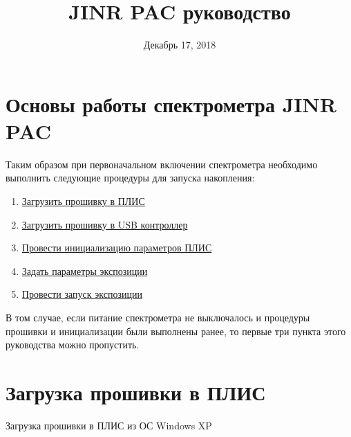 \documentclass[]{article}
\title{JINR PAC руководство}
\author{}
\date{Декабрь 17, 2018}
\begin{document}
\maketitle

\section{Основы работы спектрометра JINR PAC}

Таким образом при первоначальном включении спектрометра необходимо
выполнить следующие процедуры для запуска накопления:

\begin{enumerate}
\def\labelenumi{\arabic{enumi}.}
\item
  \hyperref[firmwareux5fFPGA]{Загрузить прошивку в ПЛИС}
\item
  \hyperref[firmwareux5fUSB]{Загрузить прошивку в USB контроллер}
\item
  \hyperref[initux5fFPGA]{Провести инициализацию параметров ПЛИС}
\item
  \hyperref[setux5fexposition]{Задать параметры экспозиции}
\item
  \hyperref[startux5fexposition]{Провести запуск экспозиции}
\end{enumerate}

В том случае, если питание спектрометра не выключалось и процедуры
прошивки и инициализации были выполнены ранее, то первые три пункта
этого руководства можно пропустить.

\section{Загрузка прошивки в ПЛИС}

Загрузка прошивки в ПЛИС из ОС Windows XP
\end{document}
